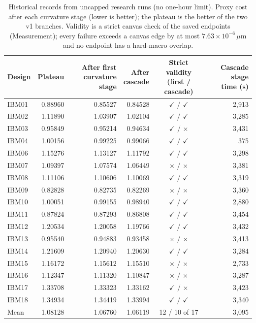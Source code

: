 \begin{table}[htbp]
\centering
\footnotesize
\caption{Historical records from uncapped research runs (no one-hour limit). Proxy cost after each curvature stage (lower is better); the plateau is the better of the two v1 branches. Validity is a strict canvas check of the saved endpoints (Measurement); every failure exceeds a canvas edge by at most $7.63\times10^{-6}\,\mu$m and no endpoint has a hard-macro overlap.}
\label{tab:curvature-stages}
\begin{tabular}{lrrrcr}
\toprule
Design & Plateau & \shortstack{After first\\curvature stage} & \shortstack{After\\cascade} & \shortstack{Strict validity\\(first / cascade)} & \shortstack{Cascade stage\\time (s)} \\
\midrule
IBM01 & 0.88960 & 0.85527 & 0.84528 & $\checkmark$ / $\checkmark$ & 2{,}913 \\
IBM02 & 1.11890 & 1.03907 & 1.02104 & $\checkmark$ / $\checkmark$ & 3{,}285 \\
IBM03 & 0.95849 & 0.95214 & 0.94634 & $\checkmark$ / $\times$ & 3{,}431 \\
IBM04 & 1.00156 & 0.99225 & 0.99066 & $\checkmark$ / $\checkmark$ & 375 \\
IBM06 & 1.15276 & 1.13127 & 1.11792 & $\checkmark$ / $\checkmark$ & 3{,}298 \\
IBM07 & 1.09397 & 1.07574 & 1.06449 & $\times$ / $\times$ & 3{,}381 \\
IBM08 & 1.11106 & 1.10606 & 1.10069 & $\checkmark$ / $\checkmark$ & 3{,}319 \\
IBM09 & 0.82828 & 0.82735 & 0.82269 & $\times$ / $\times$ & 3{,}360 \\
IBM10 & 1.00051 & 0.99155 & 0.98940 & $\checkmark$ / $\checkmark$ & 2{,}880 \\
IBM11 & 0.87824 & 0.87293 & 0.86808 & $\checkmark$ / $\checkmark$ & 3{,}454 \\
IBM12 & 1.20534 & 1.20058 & 1.19766 & $\checkmark$ / $\checkmark$ & 3{,}432 \\
IBM13 & 0.95540 & 0.94883 & 0.93458 & $\times$ / $\times$ & 3{,}413 \\
IBM14 & 1.21609 & 1.20940 & 1.20630 & $\checkmark$ / $\checkmark$ & 3{,}284 \\
IBM15 & 1.16172 & 1.15612 & 1.15510 & $\times$ / $\times$ & 2{,}733 \\
IBM16 & 1.12347 & 1.11320 & 1.10847 & $\times$ / $\times$ & 3{,}287 \\
IBM17 & 1.33708 & 1.33323 & 1.33162 & $\checkmark$ / $\times$ & 3{,}423 \\
IBM18 & 1.34934 & 1.34419 & 1.33994 & $\checkmark$ / $\checkmark$ & 3{,}340 \\
\midrule
Mean & 1.08128 & 1.06760 & 1.06119 & 12 / 10 of 17 & 3{,}095 \\
\bottomrule
\end{tabular}
\end{table}
